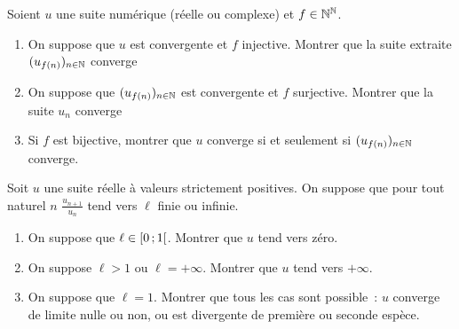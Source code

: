\begin{exercice}
    Soient \(u\) une suite numérique (réelle ou complexe) et \(f \in
    \mathbb{N}^{\mathbb{N}}\).
    \begin{enumerate}
        \item On suppose que \(u\) est convergente et \(f\) injective.
            Montrer que la suite extraite \((u_{f(n)})_{n \in \mathbb{N}}\) converge
        \item On suppose que \((u_{f(n)})_{n \in \mathbb{N}}\) est convergente et
            \(f\) surjective. Montrer que la suite \(u_n\) converge
        \item Si \(f\) est bijective, montrer que \(u\) converge si et
            seulement si \((u_{f(n)})_{n \in \mathbb{N}}\) converge.
    \end{enumerate}
\end{exercice}
\begin{exercice}
    Soit \(u\) une suite réelle à valeurs strictement positives. On
    suppose que pour tout naturel \(n\) \(\frac{u_{n+1}}{u_n}\) tend vers
    \(\ell\) finie ou infinie.
    \begin{enumerate}
        \item On suppose que \(\ell \in \left[ 0 \, ; {} 1 \right[\). Montrer que
            \(u\) tend vers zéro.
        \item On suppose \(\ell > 1\) ou \(\ell = +\infty\). Montrer que
            \(u\) tend vers \(+\infty\).
        \item On suppose que \(\ell = 1\). Montrer que tous les cas sont
            possible~: \(u\) converge de limite nulle ou non, ou est
            divergente de première ou seconde espèce.
    \end{enumerate}
\end{exercice}
